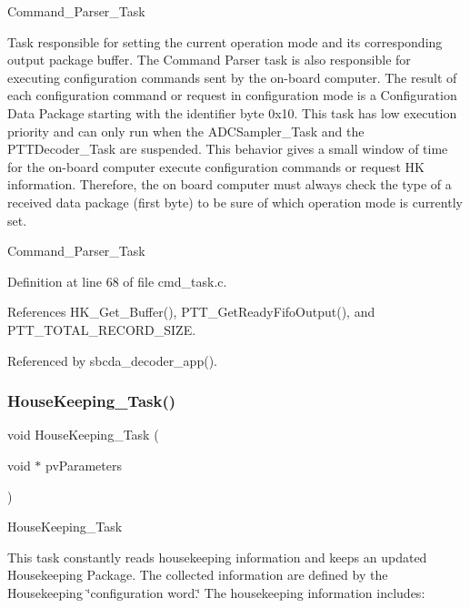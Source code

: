 Command\+\_\+\+Parser\+\_\+\+Task

Task responsible for setting the current operation mode and its corresponding output package buffer. The Command Parser task is also responsible for executing configuration commands sent by the on-\/board computer. The result of each configuration command or request in configuration mode is a Configuration Data Package starting with the identifier byte 0x10. This task has low execution priority and can only run when the A\+D\+C\+Sampler\+\_\+\+Task and the P\+T\+T\+Decoder\+\_\+\+Task are suspended. This behavior gives a small window of time for the on-\/board computer execute configuration commands or request HK information. Therefore, the on board computer must always check the type of a received data package (first byte) to be sure of which operation mode is currently set.

Command\+\_\+\+Parser\+\_\+\+Task 

Definition at line 68 of file cmd\+\_\+task.\+c.



References H\+K\+\_\+\+Get\+\_\+\+Buffer(), P\+T\+T\+\_\+\+Get\+Ready\+Fifo\+Output(), and P\+T\+T\+\_\+\+T\+O\+T\+A\+L\+\_\+\+R\+E\+C\+O\+R\+D\+\_\+\+S\+I\+ZE.



Referenced by sbcda\+\_\+decoder\+\_\+app().

\mbox{\label{group___app___tasks_gadf0ceb656d8916064e56e3ea4f1dba35}} 
\subsubsection{\texorpdfstring{House\+Keeping\+\_\+\+Task()}{HouseKeeping\_Task()}}
{\footnotesize\ttfamily void House\+Keeping\+\_\+\+Task (\begin{DoxyParamCaption}\item[{void $\ast$}]{pv\+Parameters }\end{DoxyParamCaption})}

House\+Keeping\+\_\+\+Task

This task constantly reads housekeeping information and keeps an updated Housekeeping Package. The collected information are defined by the Housekeeping \char`\"{}configuration
  word.\char`\"{} The housekeeping information includes\+:

